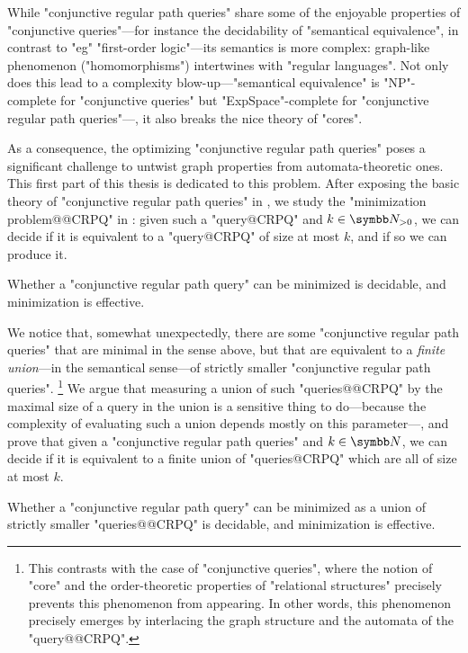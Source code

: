 While "conjunctive regular path queries" share some of the enjoyable properties
of "conjunctive queries"---for instance the decidability of "semantical equivalence",
in contrast to "eg" "first-order logic"---its semantics is more complex:
graph-like phenomenon ("homomorphisms") intertwines with "regular languages".
Not only does this lead to a complexity blow-up---"semantical equivalence" is "NP"-complete
for "conjunctive queries" but "ExpSpace"-complete for "conjunctive regular path queries"---,
it also breaks the nice theory of "cores".

As a consequence, the optimizing "conjunctive regular path queries" poses
a significant challenge to untwist graph properties from automata-theoretic ones.
This first part of this thesis is dedicated to this problem.
After exposing the basic theory of "conjunctive regular path queries"
in , we study
the "minimization problem@@CRPQ" in :
given such a "query@CRPQ" and $k\in\Np$, we can decide if it is equivalent to a "query@CRPQ"
of size at most $k$, and if so we can produce it.

\begin{contribution}
	Whether a "conjunctive regular path query" can be minimized is decidable,
	and minimization is effective.
\end{contribution}

We notice that, somewhat unexpectedly, there are some "conjunctive regular path queries"
that are minimal in the sense above, but that are equivalent to a \emph{finite union}---in the 
semantical sense---of strictly smaller "conjunctive regular path queries".%
\footnote{This contrasts with the case of "conjunctive queries",
where the notion of "core" and the order-theoretic properties
of "relational structures" precisely prevents this phenomenon from appearing.
In other words, this phenomenon precisely emerges by interlacing
the graph structure and the automata of the "query@@CRPQ".}
We argue that measuring a union of such "queries@@CRPQ" by the maximal size
of a query in the union is a sensitive thing to do---because the complexity
of evaluating such a union depends mostly on this parameter---, and prove
that given a "conjunctive regular path queries" and $k\in\N$, we can
decide if it is equivalent to a finite union of
"queries@CRPQ" which are all of size at most $k$.

\begin{contribution}
	Whether a "conjunctive regular path query" can be minimized
	as a union of strictly smaller "queries@@CRPQ" is decidable,
	and minimization is effective.
\end{contribution}

